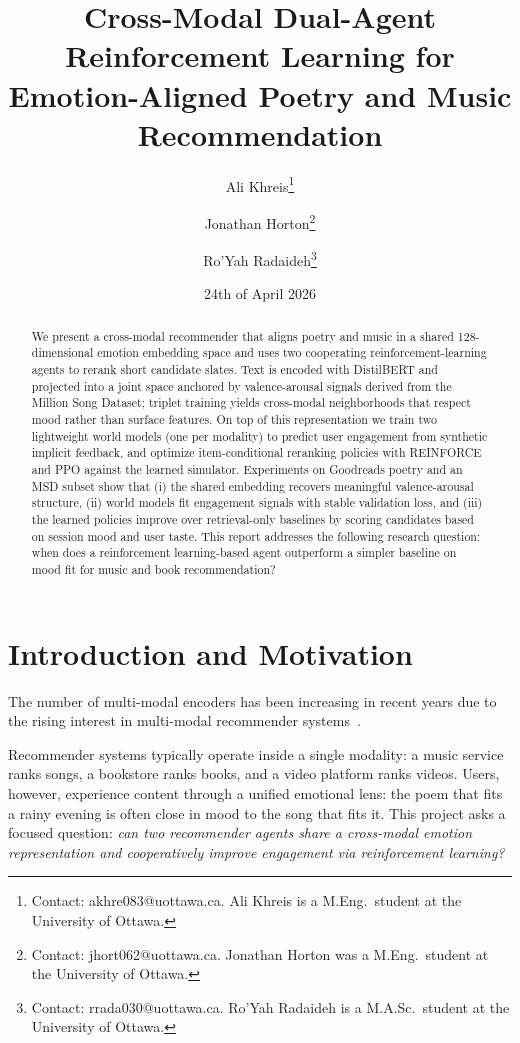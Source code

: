 \documentclass[11pt]{article}
\title{\textbf{Cross-Modal Dual-Agent Reinforcement Learning for\\
Emotion-Aligned Poetry and Music Recommendation}}
\author[1]{Ali Khreis\thanks{Contact: akhre083@uottawa.ca. Ali Khreis is a M.Eng.\ student at the University of Ottawa.}}
\author[1]{Jonathan Horton\thanks{Contact: jhort062@uottawa.ca. Jonathan Horton was a M.Eng.\ student at the University of Ottawa.}}
\author[1]{Ro'Yah Radaideh\thanks{Contact: rrada030@uottawa.ca. Ro'Yah Radaideh is a M.A.Sc.\ student at the University of Ottawa.}}
\affil[1]{University of Ottawa, CSI5340 / ELG5214, Group 4}
\date{24th of April 2026}
\begin{document}
\maketitle

\begin{abstract}
We present a cross-modal recommender that aligns poetry and music in a
shared 128-dimensional emotion embedding space and uses two cooperating
reinforcement-learning agents to rerank short candidate slates. Text is
encoded with DistilBERT and projected into a joint space anchored by
valence-arousal signals derived from the Million Song Dataset; triplet
training yields cross-modal neighborhoods that respect mood rather than
surface features. On top of this representation we train two lightweight
world models (one per modality) to predict user engagement from synthetic
implicit feedback, and optimize item-conditional reranking policies with
REINFORCE and PPO against the learned simulator. Experiments on
Goodreads poetry and an MSD subset show that (i) the shared embedding
recovers meaningful valence-arousal structure, (ii) world models fit
engagement signals with stable validation loss, and (iii) the learned
policies improve over retrieval-only baselines by scoring candidates
based on session mood and user taste. This report addresses the following
research question: when does a reinforcement learning-based agent
outperform a simpler baseline on mood fit for music and book
recommendation?
\end{abstract}

\section{Introduction and Motivation}
\label{sec:intro}

The number of multi-modal encoders has been increasing in recent years
due to the rising interest in multi-modal recommender
systems~\cite{xu2025survey}.

Recommender systems typically operate inside a single modality: a music
service ranks songs, a bookstore ranks books, and a video platform ranks
videos. Users, however, experience content through a unified emotional
lens: the poem that fits a rainy evening is often close in mood to the
song that fits it. This project asks a focused question: \emph{can two
recommender agents share a cross-modal emotion representation and
cooperatively improve engagement via reinforcement learning?}
\end{document}
